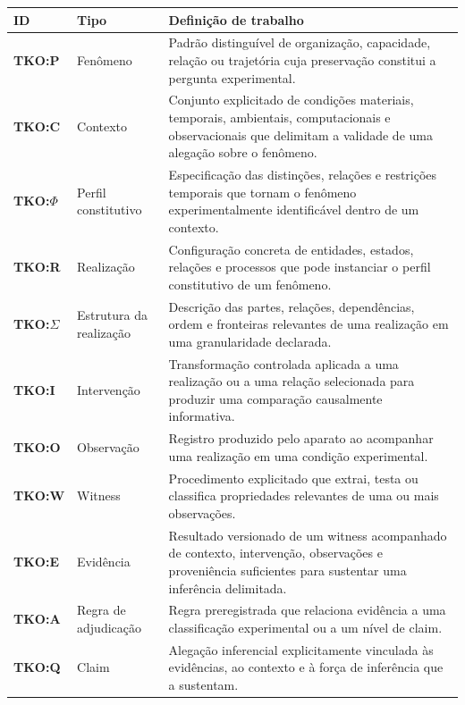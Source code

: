 \documentclass[11pt,a4paper]{article}
\begin{document}
\begin{longtable}{>{\bfseries}p{3.0cm}p{4.0cm}p{7.0cm}}
\toprule
ID & Tipo & Definição de trabalho \\
\midrule
\endhead
TKO:P & Fenômeno &
Padrão distinguível de organização, capacidade, relação ou trajetória cuja
preservação constitui a pergunta experimental. \\

TKO:C & Contexto &
Conjunto explicitado de condições materiais, temporais, ambientais, computacionais e
observacionais que delimitam a validade de uma alegação sobre o fenômeno. \\

TKO:$\Phi$ & Perfil constitutivo &
Especificação das distinções, relações e restrições temporais que tornam o fenômeno
experimentalmente identificável dentro de um contexto. \\

TKO:R & Realização &
Configuração concreta de entidades, estados, relações e processos que pode instanciar
o perfil constitutivo de um fenômeno. \\

TKO:$\Sigma$ & Estrutura da realização &
Descrição das partes, relações, dependências, ordem e fronteiras relevantes de uma
realização em uma granularidade declarada. \\

TKO:I & Intervenção &
Transformação controlada aplicada a uma realização ou a uma relação selecionada para
produzir uma comparação causalmente informativa. \\

TKO:O & Observação &
Registro produzido pelo aparato ao acompanhar uma realização em uma condição
experimental. \\

TKO:W & Witness &
Procedimento explicitado que extrai, testa ou classifica propriedades relevantes de
uma ou mais observações. \\

TKO:E & Evidência &
Resultado versionado de um witness acompanhado de contexto, intervenção, observações e
proveniência suficientes para sustentar uma inferência delimitada. \\

TKO:A & Regra de adjudicação &
Regra preregistrada que relaciona evidência a uma classificação experimental ou a um
nível de claim. \\

TKO:Q & Claim &
Alegação inferencial explicitamente vinculada às evidências, ao contexto e à força de
inferência que a sustentam. \\
\bottomrule
\end{longtable}
\end{document}
